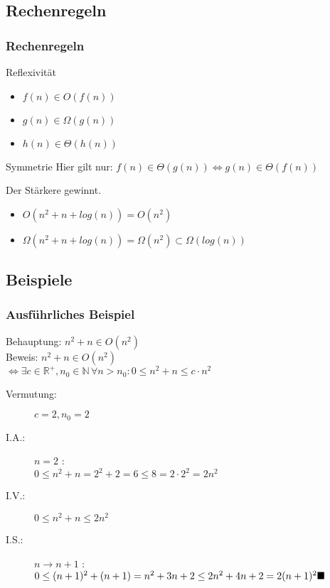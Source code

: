 \subsection{Rechenregeln}
\begin{frame}
  \frametitle{Rechenregeln}
	\begin{block}{Reflexivität}
    \begin{itemize}
      \item $f(n) \in O(f(n))$
      \item $g(n) \in \Omega(g(n))$
      \item $h(n) \in \Theta(h(n))$
    \end{itemize}
	\end{block}
	\begin{block}{Symmetrie}
	 Hier gilt nur:  $f(n) \in \Theta(g(n)) \Leftrightarrow g(n) \in \Theta(f(n))$
	\end{block}
	\begin{block}{Der Stärkere gewinnt.}
    \begin{itemize}
      \item $O(n^2 + n + log(n)) = O(n^2)$
          \item $\Omega(n^2 + n + log(n)) = \Omega(n^2) \subset \Omega(log(n))$
    \end{itemize}
  \end{block}
\end{frame}

\subsection{Beispiele}
\begin{frame}[plain]
		\frametitle{Ausführliches Beispiel}
		Behauptung: $n^2 + n \in O(n^2)$\\
    Beweis: $n^2 + n \in O(n^2)$\\
			\hspace{2em} $\Leftrightarrow \exists c \in \mathbb{R}^+, n_0 \in \mathbb{N} \,\forall n > n_0 : 0 \leq n^2+n \leq c \cdot n^2 $
		\begin{description}
			\item[Vermutung:] $ c = 2, n_0 = 2$
			\item[I.A.:] $n=2$ : \hfill \\ $ 0 \leq n^2+n = 2^2+2 = 6 \leq 8 = 2 \cdot 2^2 = 2n^2$
			\item[I.V.:] $0 \leq n^2+n \leq 2n^2$
			\item[I.S.:] $n \rightarrow n+1$ :\\ $ 0 \leq (n+1)^2 + (n+1) = n^2 + 3n + 2 \leq 2n^2 + 4n + 2 = 2(n+1)^2 \hfill \blacksquare$
		\end{description}
\end{frame}

